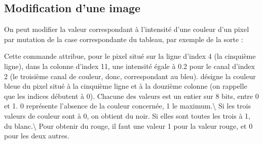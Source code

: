 \documentclass[letterpaper,10pt,english]{jupyterBook}
\begin{document}
\subsection{Modification d’une image}
\label{\detokenize{notebooks/images/TRAITEMENT-DES-IMAGES:modification-dune-image}}
\sphinxAtStartPar
On peut modifier la valeur correspondant à l’intensité d’une couleur d’un pixel par mutation de la case correspondante du tableau, par exemple de la sorte :
\begin{sphinxVerbatimInput}

\begin{sphinxVerbatim}[commandchars=\\\{\}]
\PYG{p}{[}  \PYG{p}{]}  
\end{sphinxVerbatim}
\end{sphinxVerbatimInput}

\sphinxAtStartPar
Cette commande attribue, pour le pixel situé sur la ligne d’index 4 (la cinquième ligne), dans la colonne d’index 11, une intensité égale à 0.2 pour le canal d’index 2 (le troisième canal de couleur, donc, correspondant au bleu).
désigne la couleur bleue du pixel situé à la cinquième ligne et à la douzième colonne (on rappelle que les indices débutent à 0).
Chacune des valeurs est un entier sur 8 bits, entre 0 et 1. 0 représente l’absence de la couleur concernée, 1 le maximum.\textbackslash{}
Si les trois valeurs de couleur sont à 0, on obtient du noir. Si elles sont toutes les trois à 1, du blanc.\textbackslash{} Pour obtenir du rouge, il faut une valeur 1 pour la valeur rouge, et 0 pour les deux autres.
\begin{sphinxVerbatimInput}

\begin{sphinxVerbatim}[commandchars=\\\{\}]
\PYG{p}{[} \PYG{p}{]}    
\end{sphinxVerbatim}
\end{sphinxVerbatimInput}
\end{document}

